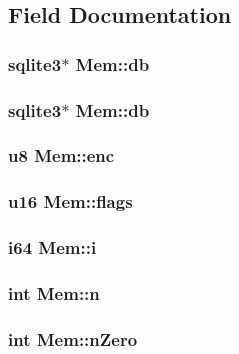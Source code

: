 \subsection{Field Documentation}
\subsubsection{\setlength{\rightskip}{0pt plus 5cm}\bf{sqlite3}$\ast$ \bf{Mem::db}}\label{structMem_4600ee82ea5aa914e8c5d6d12329cf1b}


\subsubsection{\setlength{\rightskip}{0pt plus 5cm}\bf{sqlite3}$\ast$ \bf{Mem::db}}\label{structMem_4600ee82ea5aa914e8c5d6d12329cf1b}


\subsubsection{\setlength{\rightskip}{0pt plus 5cm}\bf{u8} \bf{Mem::enc}}\label{structMem_f04ee6b5d8974251e71a57bb80a4ce4a}


\subsubsection{\setlength{\rightskip}{0pt plus 5cm}\bf{u16} \bf{Mem::flags}}\label{structMem_1e0a322352ca3764ef0275159d2b57bb}


\subsubsection{\setlength{\rightskip}{0pt plus 5cm}\bf{i64} \bf{Mem::i}}\label{structMem_190936974acce3d9dd70d7860c3123ff}


\subsubsection{\setlength{\rightskip}{0pt plus 5cm}int \bf{Mem::n}}\label{structMem_ce3519735bb77735e50f7ddef9e2a4db}


\subsubsection{\setlength{\rightskip}{0pt plus 5cm}int \bf{Mem::n\-Zero}}\label{structMem_5ce8380db2c0dbf4f46ca8b5c016263d}


